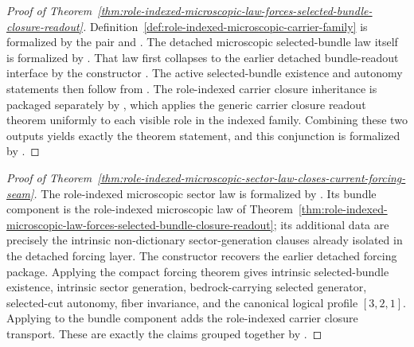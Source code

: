 \begin{proof}[Proof of Theorem~\ref{thm:role-indexed-microscopic-law-forces-selected-bundle-closure-readout}]
\label{proof:thm:role-indexed-microscopic-law-forces-selected-bundle-closure-readout}
Definition~\ref{def:role-indexed-microscopic-carrier-family} is formalized by
the pair  and
. The detached microscopic selected-bundle
law itself is formalized by . That law
first collapses to the earlier detached bundle-readout interface by the
constructor .
The active selected-bundle existence and autonomy statements then follow from
. The role-indexed carrier
closure inheritance is packaged separately by
, which applies the
generic carrier closure readout theorem uniformly to each visible role in the
indexed family. Combining these two outputs yields exactly the theorem
statement, and this conjunction is formalized by
.
\end{proof}

\begin{proof}[Proof of Theorem~\ref{thm:role-indexed-microscopic-sector-law-closes-current-forcing-seam}]
\label{proof:thm:role-indexed-microscopic-sector-law-closes-current-forcing-seam}
The role-indexed microscopic sector law is formalized by
. Its bundle component is the
role-indexed microscopic law of
Theorem~\ref{thm:role-indexed-microscopic-law-forces-selected-bundle-closure-readout};
its additional data are precisely the intrinsic non-dictionary sector-generation
clauses already isolated in the detached forcing layer. The constructor
 recovers the
earlier detached forcing package. Applying the compact forcing theorem
 gives intrinsic selected-bundle existence,
intrinsic sector generation, bedrock-carrying selected generator, selected-cut
autonomy, fiber invariance, and the canonical logical profile \([3,2,1]\).
Applying  to the bundle
component adds the role-indexed carrier closure transport. These are exactly the
claims grouped together by .
\end{proof}

